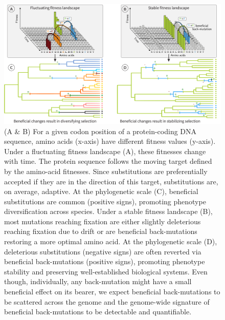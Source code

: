 \documentclass{article}
\begin{document}
    \printbibliography
\newpage
    \begin{figure}[!htb]
        \centering
        \includegraphics[width=\textwidth, page=1] {artworks/figure.fitness-landscape}
        \caption{
            (A \& B) For a given codon position of a protein-coding DNA sequence, amino acids (x-axis) have different fitness values (y-axis).
            Under a fluctuating fitness landscape (A), these fitnesses change with time.
            The protein sequence follows the moving target defined by the amino-acid fitnesses. Since substitutions are preferentially accepted if they are in the direction of this target, substitutions are, on average, adaptive.
            At the phylogenetic scale (C), beneficial substitutions are common (positive signs), promoting phenotype diversification across species.
            Under a stable fitness landscape (B), most mutations reaching fixation are either slightly deleterious reaching fixation due to drift or are beneficial back-mutations restoring a more optimal amino acid.
            At the phylogenetic scale (D), deleterious substitutions (negative signs) are often reverted via beneficial back-mutations (positive signs), promoting phenotype stability and preserving well-established biological systems.
            Even though, individually, any back-mutation might have a small beneficial effect on its bearer, we expect beneficial back-mutations to be scattered across the genome and the genome-wide signature of beneficial back-mutations to be detectable and quantifiable.}
        \label{fig:fitness-landscape}
    \end{figure}
\end{document}
